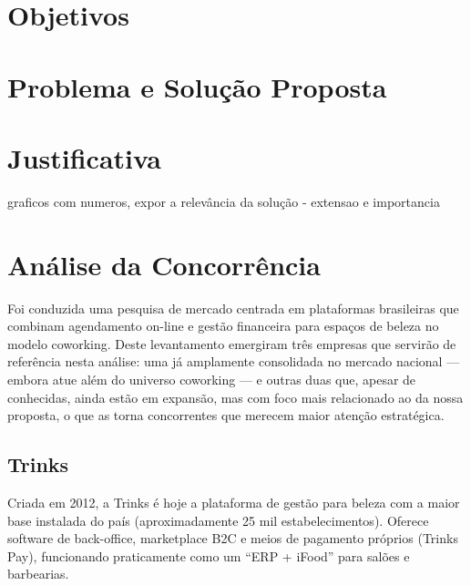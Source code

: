 
\section{Objetivos}
\section{Problema e Solução Proposta}
\section{Justificativa}
graficos com numeros, expor a relevância da solução - extensao e importancia
\section{Análise da Concorrência}

Foi conduzida uma pesquisa de mercado centrada em plataformas brasileiras que combinam agendamento on-line e gestão financeira para espaços de beleza no modelo coworking. Deste levantamento emergiram três empresas que servirão de referência nesta análise: uma já amplamente consolidada no mercado nacional — embora atue além do universo coworking — e outras duas que, apesar de conhecidas, ainda estão em expansão, mas com foco mais relacionado ao da nossa proposta, o que as torna concorrentes que merecem maior atenção estratégica.

\subsection{Trinks}


Criada em 2012, a Trinks é hoje a plataforma de gestão para beleza com a maior base instalada do país (aproximadamente 25 mil estabelecimentos). Oferece software de back-office, marketplace B2C e meios de pagamento próprios (Trinks Pay), funcionando praticamente como um “ERP + iFood” para salões e barbearias.

